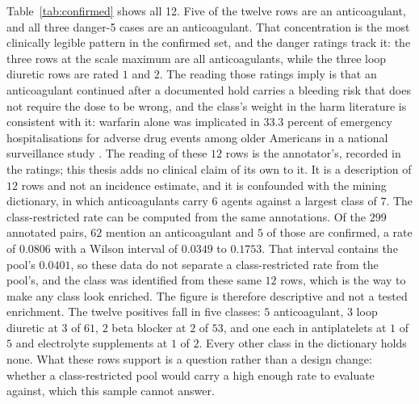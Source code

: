 Table~\ref{tab:confirmed} shows all 12. Five of the twelve rows are an
anticoagulant, and all three danger-5 cases are an anticoagulant. That concentration is the most
clinically legible pattern in the confirmed set, and the danger ratings track it: the three rows at
the scale maximum are all anticoagulants, while the three loop diuretic rows are rated $1$ and $2$.
The reading those ratings imply is that an anticoagulant continued after a documented hold carries a
bleeding risk that does not require the dose to be wrong, and the class's weight in the harm
literature is consistent with it: warfarin alone was implicated in $33.3$ percent of emergency
hospitalisations for adverse drug events among older Americans in a national surveillance study
\citep{budnitz2011emergency}. The reading of these $12$ rows is the annotator's, recorded in the
ratings; this thesis adds no clinical claim of its own to it. It is a description of $12$ rows and not
an incidence estimate, and it is confounded with the mining dictionary, in which anticoagulants
carry $6$ agents against a largest class of $7$. The class-restricted rate can be computed from the
same annotations. Of the $299$ annotated pairs, $62$ mention an anticoagulant and $5$ of those are
confirmed, a rate of $0.0806$ with a Wilson interval of $0.0349$ to $0.1753$. That interval contains
the pool's $0.0401$, so these data do not separate a class-restricted rate from the pool's, and the
class was identified from these same $12$ rows, which is the way to make any class look enriched.
The figure is therefore descriptive and not a tested enrichment. The twelve positives fall in five
classes: $5$ anticoagulant, $3$ loop diuretic at $3$ of $61$, $2$ beta blocker at $2$ of $53$, and
one each in antiplatelets at $1$ of $5$ and electrolyte supplements at $1$ of $2$. Every other
class in the dictionary holds none. What these rows support is a question rather than a design
change: whether a class-restricted pool would carry a high enough rate to evaluate against, which
this sample cannot answer.

